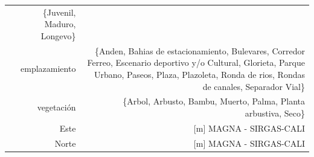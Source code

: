 \documentclass[12pt,]{book}
\begin{document}
\begin{longtable}[]{@{}rr@{}}
\begin{minipage}[t]{0.38\columnwidth}
\{Juvenil, Maduro, Longevo\}\strut
\end{minipage}\tabularnewline
\begin{minipage}[t]{0.09\columnwidth}\raggedleft\strut
emplazamiento\strut
\end{minipage} & \begin{minipage}[t]{0.38\columnwidth}\raggedleft\strut
\{Anden, Bahias de estacionamiento, Bulevares, Corredor Ferreo,
Escenario deportivo y/o Cultural, Glorieta, Parque Urbano, Paseos,
Plaza, Plazoleta, Ronda de rios, Rondas de canales, Separador
Vial\}\strut
\end{minipage}\tabularnewline
\begin{minipage}[t]{0.09\columnwidth}\raggedleft\strut
vegetación\strut
\end{minipage} & \begin{minipage}[t]{0.38\columnwidth}\raggedleft\strut
\{Arbol, Arbusto, Bambu, Muerto, Palma, Planta arbustiva, Seco\}\strut
\end{minipage}\tabularnewline
\begin{minipage}[t]{0.09\columnwidth}\raggedleft\strut
Este\strut
\end{minipage} & \begin{minipage}[t]{0.38\columnwidth}\raggedleft\strut
{[}m{]} MAGNA - SIRGAS-CALI\strut
\end{minipage}\tabularnewline
\begin{minipage}[t]{0.09\columnwidth}\raggedleft\strut
Norte\strut
\end{minipage} & \begin{minipage}[t]{0.38\columnwidth}\raggedleft\strut
{[}m{]} MAGNA - SIRGAS-CALI\strut
\end{minipage}\tabularnewline
\bottomrule
\end{longtable}
\end{document}
